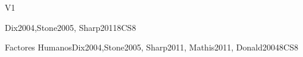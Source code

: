 \begin{syllabus}
\begin{competences}{V1}
    \item {} 
    \item {}
    \item {}
    \item {}
    \item {}
\end{competences}

\begin{unit}{\HCIFoundations}{}{Dix2004,Stone2005, Sharp2011}{8}{CS8}
\begin{topics}
    \item \HCIFoundationsTopicContexts
    \item \HCIFoundationsTopicUsability
    \item \HCIFoundationsTopicProcesses
    \item \HCIFoundationsTopicPrinciples
    \item \HCIFoundationsTopicDifferent
\end{topics}
\begin{learningoutcomes}
    \item \HCIFoundationsLODiscussWhy [\Familiarity]
    \item \HCIFoundationsLODefineA [\Familiarity]
    \item \HCIFoundationsLOSummarizeTheOf [\Familiarity]
    \item \HCIFoundationsLODevelop	[\Familiarity]
\end{learningoutcomes}
\end{unit}

\begin{unit}{Factores Humanos}{}{Dix2004,Stone2005, Sharp2011, Mathis2011, Donald2004}{8}{CS8}
\begin{topics}
    \item \HCIFoundationsTopicCognitive
    \item \HCIFoundationsTopicPhysical
    \item \HCIFoundationsTopicAccessibility
    \item \HCIFoundationsTopicInterfaces
\end{topics}
\begin{learningoutcomes}
    \item \HCIFoundationsLOCreateAnd [\Familiarity]
\end{learningoutcomes}
\end{unit}


\end{syllabus}
